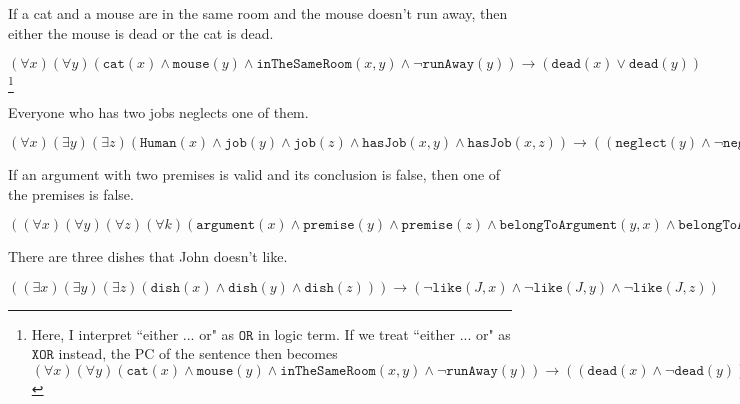 \begin{QandA}
   \item If a cat and a mouse are in the same room and the mouse doesn’t run away, then either the mouse is dead or the cat is dead.
         \begin{answered}
         $(\forall x)(\forall y)(\texttt{cat}(x) \land \texttt{mouse}(y) \land \texttt{inTheSameRoom}(x,y) \land \neg \texttt{runAway}(y)) 
         \rightarrow (\texttt{dead}(x) \lor \texttt{dead}(y))$ \footnote{Here, I interpret ``either ... or" as $\texttt{OR}$ in logic term. If
         we treat ``either ... or" as $\texttt{XOR}$ instead, the PC of the sentence then becomes
         $(\forall x)(\forall y)(\texttt{cat}(x) \land \texttt{mouse}(y) \land \texttt{inTheSameRoom}(x,y) \land \neg \texttt{runAway}(y)) 
         \rightarrow ((\texttt{dead}(x) \land \neg \texttt{dead}(y)) \lor (\texttt{dead}(y) \land \neg \texttt{dead}(x)))$} 
         \end{answered}
   \item Everyone who has two jobs neglects one of them.
         \begin{answered}
         $(\forall x)(\exists y)(\exists z)(\texttt{Human}(x) \land \texttt{job}(y) \land \texttt{job}(z) \land \texttt{hasJob}(x,y) \land
         \texttt{hasJob}(x,z)) \rightarrow ((\texttt{neglect}(y) \land \neg \texttt{neglect}(z)) \lor (\texttt{neglect}(z) \land 
         \neg \texttt{neglect}(y)))$
         \end{answered}
   \item If an argument with two premises is valid and its conclusion is false, then one of the premises is false.
         \begin{answered}
         $((\forall x)(\forall y)(\forall z)(\forall k)(\texttt{argument}(x) \land \texttt{premise}(y) \land \texttt{premise}(z)
         \land \texttt{belongToArgument}(y,x) \land \texttt{belongToArgument}(z,x) \land \texttt{valid}(x)) \rightarrow (\neg \texttt{conclusion}(k)))
         \rightarrow (\neg y \lor \neg z)$
         \end{answered}
   \item There are three dishes that John doesn’t like.
         \begin{answered}
         $((\exists x)(\exists y)(\exists z)(\texttt{dish}(x) \land \texttt{dish}(y) \land \texttt{dish}(z))) \rightarrow (
         \neg \texttt{like}(J,x) \land \neg \texttt{like}(J,y) \land \neg \texttt{like}(J,z))$
         \end{answered}
\end{QandA}